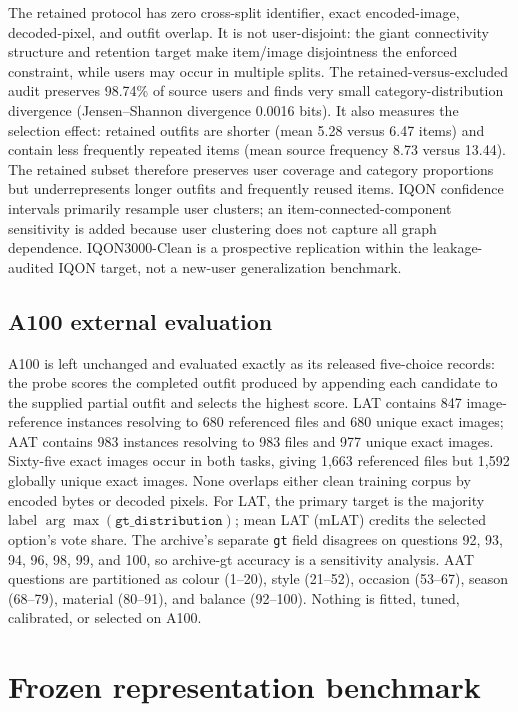 \documentclass[pdflatex,sn-mathphys-num,iicol]{sn-jnl}
\begin{document}
The retained protocol has zero cross-split identifier, exact encoded-image, decoded-pixel, and outfit overlap. It is not user-disjoint: the giant connectivity structure and retention target make item/image disjointness the enforced constraint, while users may occur in multiple splits. The retained-versus-excluded audit preserves 98.74\% of source users and finds very small category-distribution divergence (Jensen--Shannon divergence 0.0016 bits). It also measures the selection effect: retained outfits are shorter (mean 5.28 versus 6.47 items) and contain less frequently repeated items (mean source frequency 8.73 versus 13.44). The retained subset therefore preserves user coverage and category proportions but underrepresents longer outfits and frequently reused items. IQON confidence intervals primarily resample user clusters; an item-connected-component sensitivity is added because user clustering does not capture all graph dependence. IQON3000-Clean is a prospective replication within the leakage-audited IQON target, not a new-user generalization benchmark.

\subsection{A100 external evaluation}

A100 is left unchanged and evaluated exactly as its released five-choice records: the probe scores the completed outfit produced by appending each candidate to the supplied partial outfit and selects the highest score. LAT contains 847 image-reference instances resolving to 680 referenced files and 680 unique exact images; AAT contains 983 instances resolving to 983 files and 977 unique exact images. Sixty-five exact images occur in both tasks, giving 1,663 referenced files but 1,592 globally unique exact images. None overlaps either clean training corpus by encoded bytes or decoded pixels. For LAT, the primary target is the majority label $\arg\max(\texttt{gt\_distribution})$; mean LAT (mLAT) credits the selected option's vote share. The archive's separate \texttt{gt} field disagrees on questions 92, 93, 94, 96, 98, 99, and 100, so archive-gt accuracy is a sensitivity analysis. AAT questions are partitioned as colour (1--20), style (21--52), occasion (53--67), season (68--79), material (80--91), and balance (92--100). Nothing is fitted, tuned, calibrated, or selected on A100.

\section{Frozen representation benchmark}\label{sec:benchmark}
\end{document}
